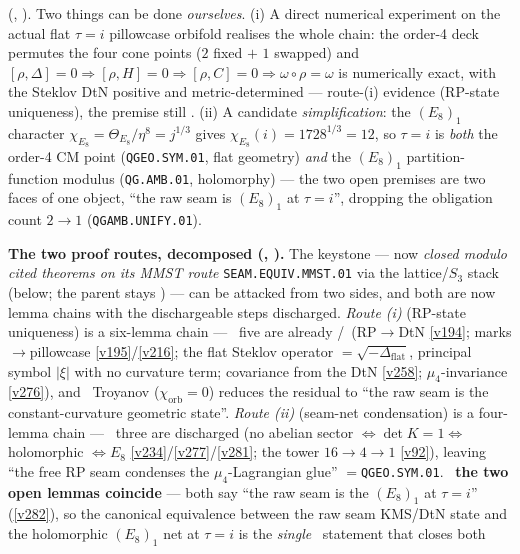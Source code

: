 \documentclass[11pt,a4paper]{article}
\begin{document}
\begin{keybox}
{(, ).} Two things can be done
\emph{ourselves}. (i) A direct numerical experiment on the actual flat $\tau{=}i$ pillowcase orbifold realises
the whole chain: the order-4 deck permutes the four cone points ($2$ fixed $+$ $1$ swapped) and
$[\rho,\Delta]{=}0\Rightarrow[\rho,H]{=}0\Rightarrow[\rho,C]{=}0\Rightarrow\omega\circ\rho{=}\omega$ is
numerically exact, with the Steklov DtN positive and metric-determined --- route-(i) evidence (RP-state
uniqueness), the premise still \mO. (ii) A candidate \emph{simplification}: the $(E_8)_1$ character
$\chi_{E_8}=\Theta_{E_8}/\eta^8=j^{1/3}$ gives $\chi_{E_8}(i)=1728^{1/3}=12$, so $\tau{=}i$ is \emph{both} the
order-4 CM point (\texttt{QGEO.SYM.01}, flat geometry) \emph{and} the $(E_8)_1$ partition-function modulus
(\texttt{QG.AMB.01}, holomorphy) --- the two open premises are two faces of one object, ``the raw seam is
$(E_8)_1$ at $\tau{=}i$'', dropping the obligation count $2\to1$ (\texttt{QGAMB.UNIFY.01}).
\par\smallskip\noindent\textbf{The two proof routes, decomposed (,
).} The keystone --- now \emph{closed modulo cited theorems on its
MMST route} \texttt{SEAM.EQUIV.MMST.01} via the
lattice/$S_3$ stack (below; the parent stays \mO) --- can be attacked from two sides, and
both are now lemma chains with the dischargeable steps discharged. \emph{Route (i)} (RP-state uniqueness) is a
six-lemma chain --- \mE\ five are already \mE/\mO\ (RP$\to$DtN \vref{v194}; marks$\to$pillowcase
\vref{v195}/\vref{v216}; the flat Steklov operator $=\sqrt{-\Delta_{\mathrm{flat}}}$, principal symbol $|\xi|$
with no curvature term; covariance from the DtN \vref{v258}; $\mu_4$-invariance \vref{v276}), and \mC\ Troyanov
($\chi_{\mathrm{orb}}{=}0$) reduces the residual to ``the raw seam is the constant-curvature geometric state''.
\emph{Route (ii)} (seam-net condensation) is a four-lemma chain --- \mE\ three are discharged (no abelian sector
$\Leftrightarrow\det K{=}1\Leftrightarrow$ holomorphic $\Leftrightarrow E_8$ \vref{v234}/\vref{v277}/\vref{v281};
the tower $16{\to}4{\to}1$ \vref{v92}), leaving ``the free RP seam condenses the $\mu_4$-Lagrangian glue''
$=$\texttt{QGEO.SYM.01}. \mE\ \textbf{the two open lemmas coincide} --- both say ``the raw seam is the
$(E_8)_1$ at $\tau{=}i$'' (\vref{v282}), so the canonical equivalence between the raw seam KMS/DtN state and the
holomorphic $(E_8)_1$ net at $\tau{=}i$ is the \emph{single} \mO\ statement that closes both

\end{keybox}
\end{document}
